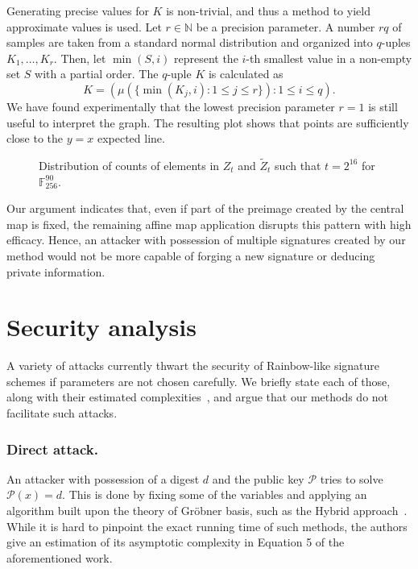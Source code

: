 \documentclass[draft, 12pt, a4paper, oneside]{memoir}
\theoremstyle{definition}
\begin{document}
Generating precise values for $K$ is non-trivial, and thus a method to yield approximate values is used. Let $r \in \mathbb{N}$ be a precision parameter. A number $rq$ of samples are taken from a standard normal distribution and organized into $q$-uples $K_{1}, \dots, K_{r}$. Then, let $\min(S, i)$ represent the $i$-th smallest value in a non-empty set $S$ with a partial order. The $q$-uple $K$ is calculated as 
\[
    K = (\mu(\{\min(K_{j}, i) : 1 \leq j \leq r\}) : 1 \leq i \leq q).
\]
We have found experimentally that the lowest precision parameter $r = 1$ is still useful to interpret the graph. The resulting plot shows that points are sufficiently close to the $y = x$ expected line.

\begin{figure}[htbp]
  \caption{Distribution of counts of elements in $Z_{t}$ and
    $\widetilde{Z}_{t}$ such that $t = 2^{16}$ for
    $\mathbb{F}_{256}^{90}$.}\label{fig:3}
\end{figure}


Our argument indicates that, even if part of the preimage created by the
central map is fixed, the remaining affine map application disrupts this
pattern with high efficacy. Hence, an attacker with possession of multiple
signatures created by our method would not be more capable of forging a new
signature or deducing private information.

\section{Security analysis}\label{subsec:analysis}

A variety of attacks currently thwart the security of Rainbow-like signature
schemes if parameters are not chosen carefully. We briefly state each of
those, along with their estimated complexities~\cite{Petzoldt:201005},
and argue that our methods do not facilitate such attacks.

\subsubsection{Direct attack.} An attacker with possession of a digest $d$ and
the public key $\mathcal{P}$ tries to solve $\mathcal{P}(x) = d$. This is done
by fixing some of the variables and applying an algorithm built upon the theory
of Gröbner basis, such as the Hybrid approach~\cite{Bettale:201207:inproc}.
While it is hard to pinpoint the exact running time of such methods, the
authors give an estimation of its asymptotic complexity in Equation 5 of the
aforementioned work.
\end{document}
